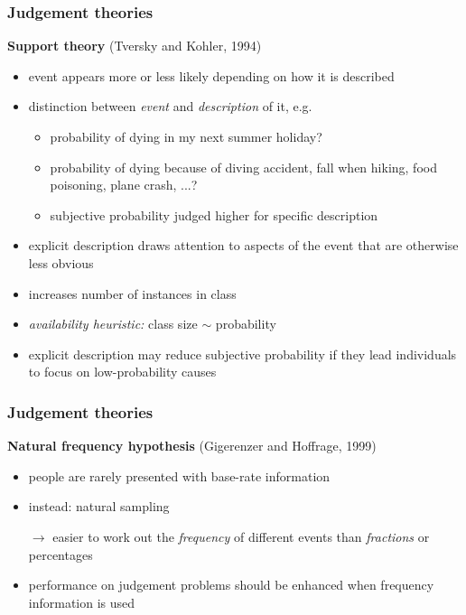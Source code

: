 \documentclass[]{beamer}
\begin{document}
\begin{frame}
 \frametitle{Judgement theories}
\begin{overlayarea}{110mm}{80mm}
 \textbf{Support theory} (Tversky and Kohler, 1994)
\begin{itemize}
 \item event appears more or less likely depending on how it is described
 \item<2->[$\rightarrow$] distinction between \textit{event} and \textit{description} of it, e.g.
 \begin{itemize}
  \item<3-> probability of dying in my next summer holiday?
  \item<3-> probability of dying because of diving accident, fall when hiking, food poisoning, plane crash, ...?
  \item<3->[$\Rightarrow$] subjective probability judged higher for specific description
 \end{itemize}
 \item<4-> explicit description draws attention to aspects of the event that are otherwise less obvious 
 \item<4->[$\rightarrow$] increases number of instances in class 
 \item<4->[$\rightarrow$]  \textit{availability heuristic:} class size $\sim$ probability
 \item[]
 \item<5->[!] explicit description may reduce subjective probability if they lead individuals to focus on low-probability causes
\end{itemize}
\end{overlayarea}
\end{frame}



\begin{frame}
 \frametitle{Judgement theories}
\begin{overlayarea}{110mm}{80mm}
 \textbf{Natural frequency hypothesis} (Gigerenzer and Hoffrage, 1999)
\begin{itemize}
 \item people are rarely presented with base-rate information
 \item instead: natural sampling
 \item[$\rightarrow$] easier to work out the \textit{frequency} of different events than \textit{fractions} or percentages
 \item<2->[$\rightarrow$] performance on judgement problems should be enhanced when frequency information is used
\end{itemize}
\end{overlayarea}
\end{frame}
\end{document}
